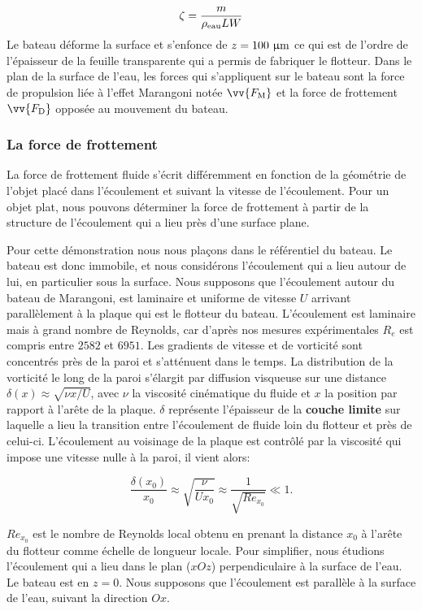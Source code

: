\documentclass[french, 10pt]{article}
\begin{document}
\begin{equation}
  \zeta = \frac{m}{\rho_{\rm eau} L W}
\end{equation}
Le bateau déforme la surface et s'enfonce de $z=100~\rm \upmu m$ ce qui est de l'ordre de l'épaisseur de la feuille transparente qui a permis de fabriquer le flotteur. Dans le plan de la surface de l'eau, les forces qui s'appliquent sur le bateau sont la force de propulsion liée à l'effet Marangoni notée $\vv{F_{\rm M}}$ et la force de frottement $\vv{F_{\rm D}}$ opposée au mouvement du bateau.
\subsubsection{La force de frottement}
La force de frottement fluide s'écrit différemment en fonction de la géométrie de l'objet placé dans l'écoulement et suivant la vitesse de l'écoulement. Pour un objet plat, nous pouvons déterminer la force de frottement à partir de la structure de l'écoulement qui a lieu près d'une surface plane.\bigskip

Pour cette démonstration nous nous plaçons dans le référentiel du bateau. Le bateau est donc immobile, et nous considérons l'écoulement qui a lieu autour de lui, en particulier sous la surface. Nous supposons que l'écoulement autour du bateau de Marangoni, est laminaire et uniforme de vitesse $U$ arrivant parallèlement à la plaque qui est le flotteur du bateau. L'écoulement est laminaire mais à grand nombre de Reynolds, car d'après nos mesures expérimentales $R_e$ est compris entre $2582$ et $6951$. Les gradients de vitesse et de vorticité sont concentrés près de la paroi et s'atténuent dans le temps. La distribution de la vorticité le long de la paroi s'élargit par diffusion visqueuse sur une distance $\delta(x)\approx \sqrt{\nu x/U}$, avec $\nu$ la viscosité cinématique du fluide et $x$ la position par rapport à l'arête de la plaque. $\delta$ représente l'épaisseur de la \textbf{couche limite} sur laquelle a lieu la transition entre l'écoulement de fluide loin du flotteur et près de celui-ci. L'écoulement au voisinage de la plaque est contrôlé par la viscosité qui impose une vitesse nulle à la paroi, il vient alors:

\begin{equation}
  \frac{\delta(x_0)}{x_0} \approx \sqrt{\frac{\nu}{Ux_0}}\approx \frac{1}{\sqrt{Re_{x_0}}} \ll 1\label{eq:couchelimitebateau}.
\end{equation}

$Re_{x_0}$ est le nombre de Reynolds local obtenu en prenant la distance $x_0$ à l'arête du flotteur comme échelle de longueur locale. Pour simplifier, nous étudions l'écoulement qui a lieu dans le plan ($xOz$) perpendiculaire à la surface de l'eau. Le bateau est en $z=0$. Nous supposons que l'écoulement est parallèle à la surface de l'eau, suivant la direction $Ox$.
\end{document}

